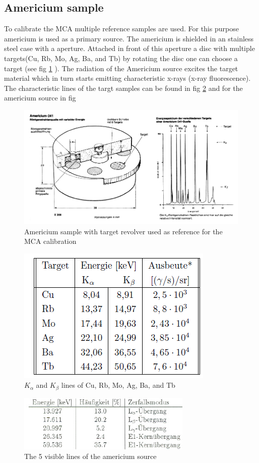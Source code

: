 \subsection{Americium sample}
To calibrate the MCA multiple reference samples are used. For this purpose americium is used as a primary source. The americium is shielded in an stainless steel case with a aperture. Attached in front of this aperture a disc with multiple targets(Cu, Rb, Mo, Ag, Ba, and Tb) by rotating the disc one can choose a target (see fig \ref{fig:Americium} ). The radiation of the Americium source excites the target material which in turn starts emitting characteristic x-rays (x-ray fluorescence)\cite{landgraf}. The characteristic lines of the targt samples can be found in fig \ref{fig:Americium_table} and for the americium source in fig
\begin{figure}[H]
\centering
\includegraphics[width=0.7\linewidth]{graphics/Americium}
\caption[Americium sample]{Americium sample with target revolver used as  reference for the MCA calibration\cite{anleitung}}
\label{fig:Americium}
\end{figure}
\begin{figure}[H]
\centering
\includegraphics[height=0.2\textheight]{graphics/Americium_table}
\caption{$K_\alpha$ and $K_\beta$ lines of Cu, Rb, Mo, Ag, Ba, and Tb\cite{anleitung}}
\label{fig:Americium_table}
\end{figure}
\begin{figure}[H]
\centering
\includegraphics[height=0.2\textheight]{graphics/Amercium_lines}
\caption{The 5 visible lines of the americium source\cite{landgraf}}
\label{fig:Amercium_lines}
\end{figure}

